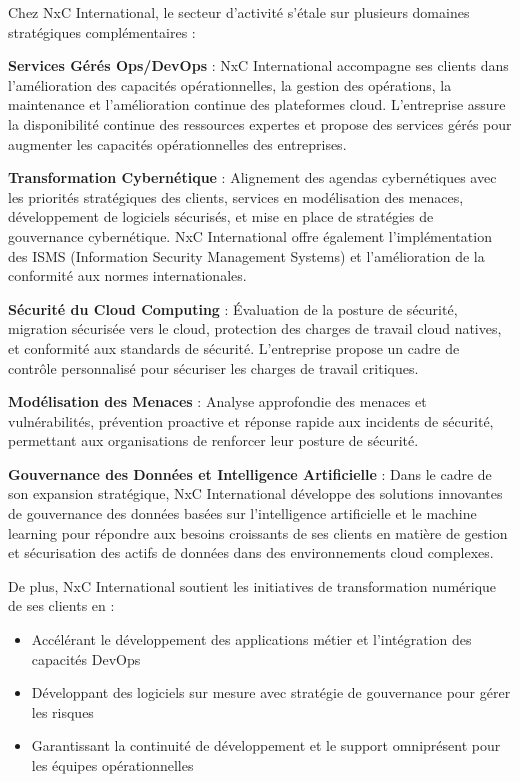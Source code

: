 Chez NxC International, le secteur d'activité s'étale sur plusieurs domaines stratégiques complémentaires :

\textbf{Services Gérés Ops/DevOps} : NxC International accompagne ses clients dans l'amélioration des capacités opérationnelles, la gestion des opérations, la maintenance et l'amélioration continue des plateformes cloud. L'entreprise assure la disponibilité continue des ressources expertes et propose des services gérés pour augmenter les capacités opérationnelles des entreprises.

\textbf{Transformation Cybernétique} : Alignement des agendas cybernétiques avec les priorités stratégiques des clients, services en modélisation des menaces, développement de logiciels sécurisés, et mise en place de stratégies de gouvernance cybernétique. NxC International offre également l'implémentation des ISMS (Information Security Management Systems) et l'amélioration de la conformité aux normes internationales.

\textbf{Sécurité du Cloud Computing} : Évaluation de la posture de sécurité, migration sécurisée vers le cloud, protection des charges de travail cloud natives, et conformité aux standards de sécurité. L'entreprise propose un cadre de contrôle personnalisé pour sécuriser les charges de travail critiques.

\textbf{Modélisation des Menaces} : Analyse approfondie des menaces et vulnérabilités, prévention proactive et réponse rapide aux incidents de sécurité, permettant aux organisations de renforcer leur posture de sécurité.

\textbf{Gouvernance des Données et Intelligence Artificielle} : Dans le cadre de son expansion stratégique, NxC International développe des solutions innovantes de gouvernance des données basées sur l'intelligence artificielle et le machine learning pour répondre aux besoins croissants de ses clients en matière de gestion et sécurisation des actifs de données dans des environnements cloud complexes.

De plus, NxC International soutient les initiatives de transformation numérique de ses clients en :
\begin{itemize}
    \item Accélérant le développement des applications métier et l'intégration des capacités DevOps
    \item Développant des logiciels sur mesure avec stratégie de gouvernance pour gérer les risques
    \item Garantissant la continuité de développement et le support omniprésent pour les équipes opérationnelles
\end{itemize}

